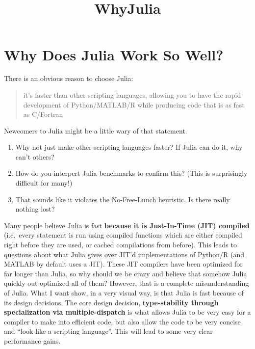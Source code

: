 \documentclass[11pt]{article}
\title{WhyJulia}
\providecommand{\tightlist}{%
      \setlength{\itemsep}{0pt}\setlength{\parskip}{0pt}}
\begin{document}
    
    
    \maketitle
    
    

    
    \hypertarget{why-does-julia-work-so-well}{%
\section{Why Does Julia Work So
Well?}\label{why-does-julia-work-so-well}}

There is an obvious reason to choose Julia:

\begin{quote}
it's faster than other scripting languages, allowing you to have the
rapid development of Python/MATLAB/R while producing code that is as
fast as C/Fortran
\end{quote}

Newcomers to Julia might be a little wary of that statement.

\begin{enumerate}
\def\labelenumi{\arabic{enumi}.}
\tightlist
\item
  Why not just make other scripting languages faster? If Julia can do
  it, why can't others?
\item
  How do you interpert Julia benchmarks to confirm this? (This is
  surprisingly difficult for many!)
\item
  That sounds like it violates the No-Free-Lunch heuristic. Is there
  really nothing lost?
\end{enumerate}

Many people believe Julia is fast \textbf{because it is Just-In-Time
(JIT) compiled} (i.e.~every statement is run using compiled functions
which are either compiled right before they are used, or cached
compilations from before). This leads to questions about what Julia
gives over JIT'd implementations of Python/R (and MATLAB by default uses
a JIT). These JIT compilers have been optimized for far longer than
Julia, so why should we be crazy and believe that somehow Julia quickly
out-optimized all of them? However, that is a complete misunderstanding
of Julia. What I want show, in a very visual way, is that Julia is fast
because of its design decisions. The core design decision,
\textbf{type-stability through specialization via multiple-dispatch} is
what allows Julia to be very easy for a compiler to make into efficient
code, but also allow the code to be very concise and ``look like a
scripting language''. This will lead to some very clear performance
gains.
\end{document}
